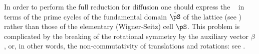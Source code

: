 {%
%
In order to perform the full reduction for diffusion one should
express the \dzeta\  in terms of the prime cycles of
the fundamental domain $\tilde \pS$ of the lattice (see
) rather than
those of the elementary (Wigner-Seitz) cell $\pS$.  This problem is
complicated by
the breaking of the rotational symmetry by the auxiliary vector
$\beta$, or, in other words, the non-commutativity of translations and
rotations: see
.
\label{r:LorentzFundDomain}
}%


